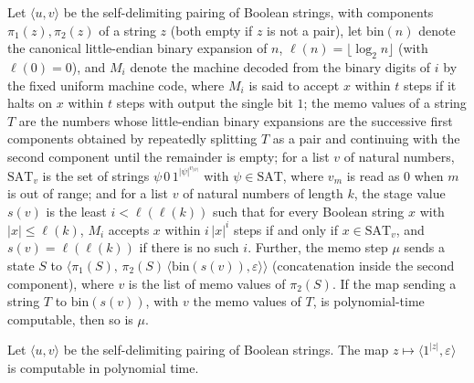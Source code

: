 \begin{theorem}
\label{Complexity.ladner_memoStep_FP}
\leanok
{}
Let $\langle u,v\rangle$ be the self-delimiting pairing of Boolean strings, with components $\pi_1(z),\pi_2(z)$ of a string $z$ (both empty if $z$ is not a pair), let $\mathrm{bin}(n)$ denote the canonical little-endian binary expansion of $n$, $\ell(n)=\lfloor\log_2 n\rfloor$ (with $\ell(0)=0$), and $M_i$ denote the machine decoded from the binary digits of $i$ by the fixed uniform machine code, where $M_i$ is said to accept $x$ within $t$ steps if it halts on $x$ within $t$ steps with output the single bit $1$; the memo values of a string $T$ are the numbers whose little-endian binary expansions are the successive first components obtained by repeatedly splitting $T$ as a pair and continuing with the second component until the remainder is empty; for a list $v$ of natural numbers, $\mathrm{SAT}_v$ is the set of strings $\psi\,0\,1^{|\psi|^{v_{|\psi|}}}$ with $\psi\in\mathrm{SAT}$, where $v_m$ is read as $0$ when $m$ is out of range; and for a list $v$ of natural numbers of length $k$, the stage value $s(v)$ is the least $i<\ell(\ell(k))$ such that for every Boolean string $x$ with $|x|\le\ell(k)$, $M_i$ accepts $x$ within $i\,|x|^i$ steps if and only if $x\in\mathrm{SAT}_v$, and $s(v)=\ell(\ell(k))$ if there is no such $i$. Further, the memo step $\mu$ sends a state $S$ to $\langle\pi_1(S),\,\pi_2(S)\,\langle\mathrm{bin}(s(v)),\varepsilon\rangle\rangle$ (concatenation inside the second component), where $v$ is the list of memo values of $\pi_2(S)$. If the map
sending a string $T$ to $\mathrm{bin}(s(v))$, with $v$ the memo values of $T$, is polynomial-time
computable, then so is $\mu$.
\end{theorem}

\begin{theorem}
\label{Complexity.ladner_memoInit_FP}
\leanok
{}
Let $\langle u,v\rangle$ be the self-delimiting pairing of Boolean strings. The map
$z\mapsto\langle 1^{|z|},\varepsilon\rangle$ is computable in polynomial time.
\end{theorem}

